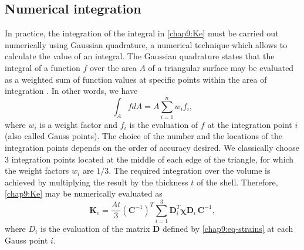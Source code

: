 	\subsection{Numerical integration}
In practice, the integration of the integral in \eqref{chap9:Ke} must be carried out numerically using Gaussian quadrature, a numerical technique which allows to calculate the value of an integral. The Gaussian quadrature states that the integral of a function $ f $ over the area $ A $ of a triangular surface may be evaluated as a weighted sum of function values at specific points within the area of integration \citep{Cowper73}. In other words, we have
\begin{equation}
\int_{A} f dA = A \sum_{i=1}^n w_i f_i,
\end{equation}
where $ w_i $ is a weight factor and $ f_i $ is the evaluation of $ f $ at the integration point $ i $ (also called Gauss points). The choice of the number and the locations of the integration points depends on the order of accuracy desired. We classically choose 3 integration points located at the middle of each edge of the triangle, for which the weight factors $ w_i $ are $ 1/3 $. The required integration over the volume is achieved by multiplying the result by the thickness $ t $ of the shell. Therefore, \eqref{chap9:Ke} may be numerically evaluated as
\begin{equation}
\textbf{K}_e = \dfrac{A t}{3} (\textbf{C}^{-1})^T \sum_{i=1}^3 \textbf{D}_i^{T} \boldsymbol\chi \textbf{D}_i  \, \textbf{C}^{-1},
\end{equation}
where $ D_i $ is the evaluation of the matrix $ \mathbf{D} $ defined by \eqref{chap9:eq-strains} at each Gauss point $ i $. 

\bigskip

